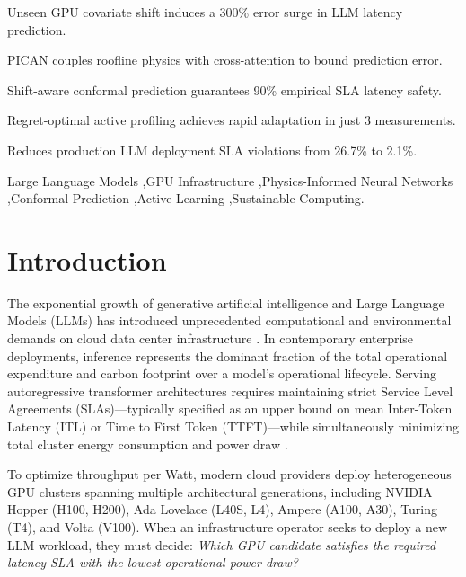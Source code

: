 \documentclass[3p,12pt]{elsarticle}
\begin{document}
\begin{frontmatter}
\begin{highlights}
\item Unseen GPU covariate shift induces a 300\% error surge in LLM latency prediction.
\item PICAN couples roofline physics with cross-attention to bound prediction error.
\item Shift-aware conformal prediction guarantees 90\% empirical SLA latency safety.
\item Regret-optimal active profiling achieves rapid adaptation in just 3 measurements.
\item Reduces production LLM deployment SLA violations from 26.7\% to 2.1\%.
\end{highlights}

\begin{keyword}
Large Language Models \sep GPU Infrastructure \sep Physics-Informed Neural Networks \sep Conformal Prediction \sep Active Learning \sep Sustainable Computing.
\end{keyword}

\end{frontmatter}

\linenumbers

\section{Introduction}
\label{sec:intro}

The exponential growth of generative artificial intelligence and Large Language Models (LLMs) has introduced unprecedented computational and environmental demands on cloud data center infrastructure \citep{strubell2019energy, patterson2021carbon}. In contemporary enterprise deployments, inference represents the dominant fraction of the total operational expenditure and carbon footprint over a model's operational lifecycle. Serving autoregressive transformer architectures requires maintaining strict Service Level Agreements (SLAs)---typically specified as an upper bound on mean Inter-Token Latency (ITL) or Time to First Token (TTFT)---while simultaneously minimizing total cluster energy consumption and power draw \citep{kwon2023vllm}.

To optimize throughput per Watt, modern cloud providers deploy heterogeneous GPU clusters spanning multiple architectural generations, including NVIDIA Hopper (H100, H200), Ada Lovelace (L40S, L4), Ampere (A100, A30), Turing (T4), and Volta (V100). When an infrastructure operator seeks to deploy a new LLM workload, they must decide: \textit{Which GPU candidate satisfies the required latency SLA with the lowest operational power draw?} 
\end{document}
